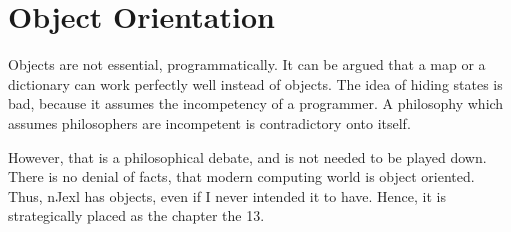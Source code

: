 \chapter{Object Orientation}\label{object-orientation}

{\LARGE O}bjects are not essential, programmatically.
It can be argued that a map or a dictionary can work perfectly well
instead of objects. The idea of hiding states is bad, because it assumes
the incompetency of a programmer. A philosophy which assumes philosophers
are incompetent is contradictory onto itself. 

However, that is a philosophical debate, and is not needed to be played down.
There is no denial of facts, that modern computing world is object oriented.
Thus, nJexl has objects, even if I never intended it to have.
Hence, it is strategically placed as the chapter the 13.

